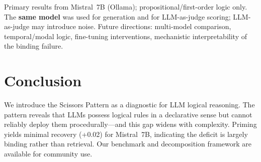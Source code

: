 \documentclass{article}
\begin{document}
Primary results from Mistral~7B (Ollama); propositional/first-order logic
only. The \textbf{same model} was used for generation and for LLM-as-judge scoring; LLM-as-judge may introduce noise.
Future directions: multi-model comparison, temporal/modal logic,
fine-tuning interventions, mechanistic interpretability of the
binding failure.

\section{Conclusion}

We introduce the Scissors Pattern as a diagnostic for LLM logical
reasoning.
The pattern reveals that LLMs possess logical rules in a declarative
sense but cannot reliably deploy them procedurally---and this gap
widens with complexity.
Priming yields minimal recovery (+0.02) for Mistral~7B, indicating the deficit is largely binding rather than retrieval.
Our benchmark and decomposition framework are available for community
use.



\end{document}
